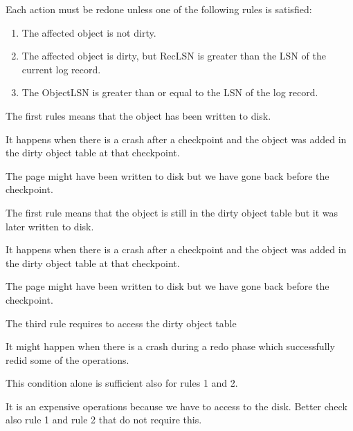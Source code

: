 \documentclass{beamer}
\begin{document}
\begin{slide}{
	\item Each action must be redone unless one of the following rules is satisfied:
	\begin{enumerate}
		\item The affected object is not dirty.
		\item The affected object is dirty, but RecLSN is greater than the LSN of the current log record.
		\item The ObjectLSN is greater than or equal to the LSN of the log record.
	\end{enumerate}
}\end{slide}

\begin{slide}{
	\item The first rules means that the object has been written to disk.
	\item It happens when there is a crash after a checkpoint and the object was added in the dirty object table at that checkpoint.
	\item The page might have been written to disk but we have gone back before the checkpoint.
}\end{slide}

\begin{slide}{
	\item The first rule means that the object is still in the dirty object table but it was later written to disk.
	\item It happens when there is a crash after a checkpoint and the object was added in the dirty object table at that checkpoint.
	\item The page might have been written to disk but we have gone back before the checkpoint.
}\end{slide}

\begin{slide}{
	\item The third rule requires to access the dirty object table
	\item It might happen when there is a crash during a redo phase which successfully redid some of the operations.
	\item This condition alone is sufficient also for rules 1 and 2.
	\item It is an expensive operations because we have to access to the disk. Better check also rule 1 and rule 2 that do not require this.
}\end{slide}
\end{document}
